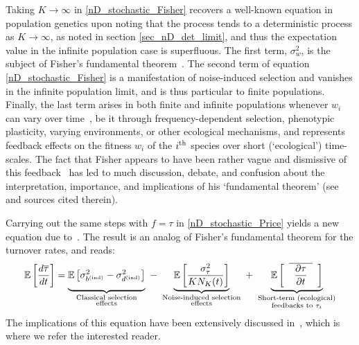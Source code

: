 Taking $K \to \infty$ in \eqref{nD_stochastic_Fisher} recovers a well-known equation in population genetics upon noting that the process tends to a deterministic process as $K \to \infty$, as noted in section \ref{sec_nD_det_limit}, and thus the expectation value in the infinite population case is superfluous. The first term, $\sigma^2_w$, is the subject of Fisher's fundamental theorem~\citep{fisher_genetical_1930,  price_fishers_1972, frank_fishers_1992, kokko_stagnation_2021}. The second term of equation \eqref{nD_stochastic_Fisher} is a manifestation of noise-induced selection and vanishes in the infinite population limit, and is thus particular to finite populations. Finally, the last term arises in both finite and infinite populations whenever $w_i$ can vary over time~\citep{frank_fishers_1992,kokko_stagnation_2021,baez_fundamental_2021}, be it through frequency-dependent selection, phenotypic plasticity, varying environments, or other ecological mechanisms, and represents feedback effects on the fitness $w_i$ of the $i\textsuperscript{th}$ species over short (`ecological') time-scales. The fact that Fisher appears to have been rather vague and dismissive of this feedback~\citep{fisher_genetical_1930} has led to much discussion, debate, and confusion about the interpretation, importance, and implications of his `fundamental theorem' (see~\cite{kokko_stagnation_2021} and sources cited therein).

Carrying out the same steps with $f = \tau$ in \eqref{nD_stochastic_Price} yields a new equation due to~\cite{kuosmanen_turnover_2022}. The result is an analog of Fisher's fundamental theorem for the turnover rates, and reads:
\begin{equation}
\label{nD_stochastic_Fisher_turnover}
\mathbb{E}\left[\frac{d\overline{\tau}}{dt}\right] = \underbrace{\vphantom{ \mathbb{E}\left[\frac{\sigma^2_{\tau}}{KN_K(t)}\right] } \mathbb{E}\left[\sigma^2_{b^{\textrm{(ind)}}} - \sigma^2_{d^{\textrm{(ind)}}}\right]}_{\substack{\text{Classical selection} \\ \text{effects}}} \ - \ \underbrace{ \mathbb{E}\left[\frac{\sigma^2_{\tau}}{KN_K(t)}\right]}_{\substack{\text{Noise-induced selection} \\ \text{effects}}} \ + \ \underbrace{ \vphantom{ \mathbb{E}\left[\frac{\sigma^2_{\tau}}{KN_K(t)}\right] } \mathbb{E}\left[\hphantom{a}\overline{\hphantom{a}\frac{\partial \tau}{\partial t}\hphantom{a}}\hphantom{a}\right]}_{\substack{\text{Short-term (ecological)} \\ \text{feedbacks to $\tau_i$}}}
\end{equation}
The implications of this equation have been extensively discussed in~\cite{kuosmanen_turnover_2022}, which is where we refer the interested reader.

